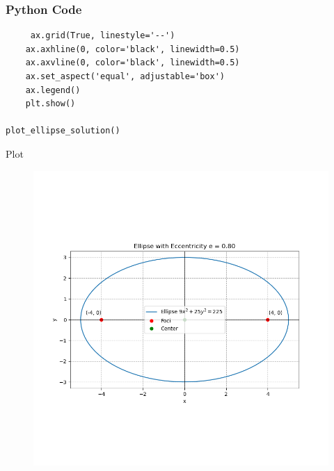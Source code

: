 \documentclass{beamer}
\begin{document}
\begin{frame}[fragile]
    \frametitle{Python Code }
    \begin{lstlisting}
     ax.grid(True, linestyle='--')
    ax.axhline(0, color='black', linewidth=0.5)
    ax.axvline(0, color='black', linewidth=0.5)
    ax.set_aspect('equal', adjustable='box')
    ax.legend()
    plt.show()

plot_ellipse_solution()
      \end{lstlisting}
\end{frame} 

\begin{frame}{Plot}

\begin{figure}
    \centering
    \includegraphics[width=0.8\linewidth]{Beamer/figs/ellipse.png}
    \caption{}
    \label{fig:placeholder}
\end{figure}

\end{frame}
\end{document}
